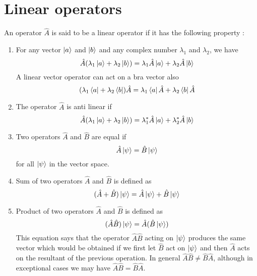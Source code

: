 \section{Linear operators}
An operator $\hat{A}$ is said to be a linear operator if it has the following property : 
\begin{enumerate}
	\item 
	For any vector $\ket{a}$ and $\ket{b}$ and any complex number $\lambda_1$ and $\lambda_2$, we have
	\begin{equation}\label{eqn3.5}
	\hat{A} (\lambda_1 \ket{a} + \lambda_2 \ket{b}) = \lambda_1 \hat{A} \ket{a} + \lambda_2 \hat{A} \ket{b}
	\end{equation}
	A linear vector operator can act on a bra vector also
	\begin{equation}\label{eqn3.6}
	(\lambda_1 \bra{a} + \lambda_2 \bra{b}) \hat{A} = \lambda_1 \bra{a} \hat{A} + \lambda_2 \bra{b} \hat{A}
	\end{equation}
	
	\item 
	The operator $\hat{A}$ is anti linear if
	\begin{equation}\label{eqn3.7}
	\hat{A} (\lambda_1 \ket{a} + \lambda_2 \ket{b}) = \lambda_1^* \hat{A} \ket{a} + \lambda_2^* \hat{A} \ket{b}
	\end{equation}
	
	\item 
	Two operators $\hat{A}$ and $\hat{B}$ are equal if 
	\begin{equation}\label{eqn3.8}
	\hat{A} \ket{\psi} = \hat{B} \ket{\psi}
	\end{equation}
	for all $\ket{\psi}$ in the vector space.
	
	\item 
	Sum of two operators $\hat{A}$ and $\hat{B}$ is defined as
	\begin{equation}\label{eqn3.9}
	(\hat{A} + \hat{B}) \ket{\psi} = \hat{A} \ket{\psi} + \hat{B} \ket{\psi}
	\end{equation}
	
	\item 
	Product of two operators $\hat{A}$ and $\hat{B}$ is defined as
	\begin{equation}\label{eqn3.10}
	(\hat{A} \hat{B}) \ket{\psi} = 	\hat{A} (\hat{B} \ket{\psi})
	\end{equation}
	This equation says that the operator $\hat{A} \hat{B}$ acting on $\ket{\psi}$ produces the same vector which would be obtained if we first let $\hat{B}$ act on $\ket{\psi}$ and then $\hat{A}$ acts on the resultant of the previous operation. In general $\hat{A}\hat{B} \neq \hat{B}\hat{A}$, although in exceptional cases we may have $\hat{A}\hat{B} = \hat{B}\hat{A}$.
	
\end{enumerate}

